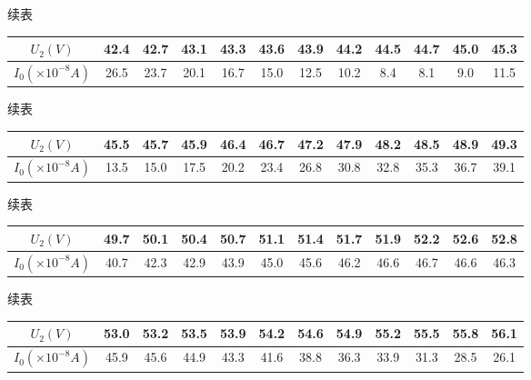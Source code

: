\documentclass{article}
\begin{document}
    续表

    \begin{center}
        \begin{tabular}{|c|c|c|c|c|c|c|c|c|c|c|c|}
            \hline
            $U_2(V)$ & 42.4  & 42.7  & 43.1  & 43.3  & 43.6  & 43.9  & 44.2  & 44.5  & 44.7  & 45.0  & 45.3  \bigstrut\\
            \hline
            $I_0(\times 10^{-8}A)$ & 26.5  & 23.7  & 20.1  & 16.7  & 15.0  & 12.5  & 10.2  & 8.4   & 8.1   & 9.0   & 11.5  \bigstrut\\
            \hline
        \end{tabular}%
    \end{center}

    续表

    \begin{center}
        \begin{tabular}{|c|c|c|c|c|c|c|c|c|c|c|c|}
            \hline
            $U_2(V)$ & 45.5  & 45.7  & 45.9  & 46.4  & 46.7  & 47.2  & 47.9  & 48.2  & 48.5  & 48.9  & 49.3  \bigstrut\\
            \hline
            $I_0(\times 10^{-8}A)$ & 13.5  & 15.0  & 17.5  & 20.2  & 23.4  & 26.8  & 30.8  & 32.8  & 35.3  & 36.7  & 39.1  \bigstrut\\
            \hline
        \end{tabular}%
    \end{center}

    续表

    \begin{center}
        \begin{tabular}{|c|c|c|c|c|c|c|c|c|c|c|c|}
            \hline
            $U_2(V)$ & 49.7  & 50.1  & 50.4  & 50.7  & 51.1  & 51.4  & 51.7  & 51.9  & 52.2  & 52.6  & 52.8  \bigstrut\\
            \hline
            $I_0(\times 10^{-8}A)$ & 40.7  & 42.3  & 42.9  & 43.9  & 45.0  & 45.6  & 46.2  & 46.6  & 46.7  & 46.6  & 46.3  \bigstrut\\
            \hline
        \end{tabular}%
    \end{center}

    续表

    \begin{center}
        \begin{tabular}{|c|c|c|c|c|c|c|c|c|c|c|c|}
            \hline
            $U_2(V)$ & 53.0  & 53.2  & 53.5  & 53.9  & 54.2  & 54.6  & 54.9  & 55.2  & 55.5  & 55.8  & 56.1  \bigstrut\\
            \hline
            $I_0(\times 10^{-8}A)$ & 45.9  & 45.6  & 44.9  & 43.3  & 41.6  & 38.8  & 36.3  & 33.9  & 31.3  & 28.5  & 26.1  \bigstrut\\
            \hline
        \end{tabular}%
    \end{center}
\end{document}
